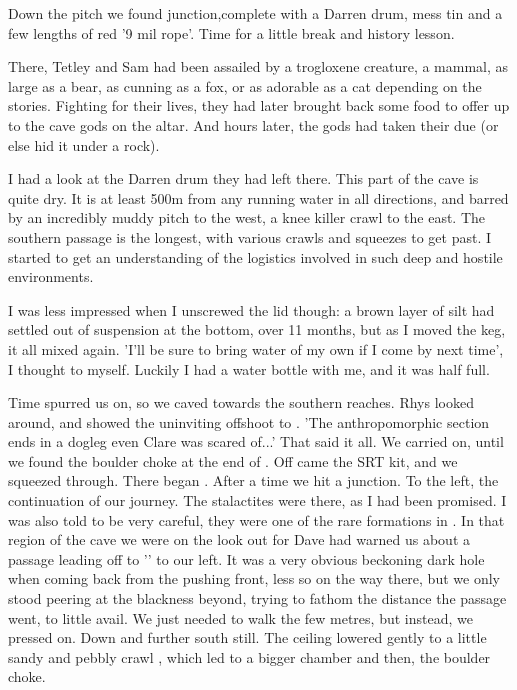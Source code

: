 Down the pitch we found  junction,complete with a Darren drum, mess tin and a few lengths of red '9 mil rope'. Time for a little break and history lesson. 

There, Tetley and Sam had been assailed by a trogloxene creature, a mammal, as large as a bear, as cunning as a fox, or as adorable as a cat depending on the stories. Fighting for their lives, they had later brought back some food to offer up to the cave gods on the  altar. And hours later, the gods had taken their due (or else hid it under a rock). 

I had a look at the Darren drum they had left there. This part of the cave is quite dry. It is at least 500m from any running water in all directions, and barred by an incredibly muddy pitch to the west, a knee killer crawl to the east. The southern passage is the longest, with various crawls and squeezes to get past. I started to get an understanding of the logistics involved in such deep and hostile environments.

I was less impressed when I unscrewed the lid though: a brown layer of silt had settled out of suspension at the bottom, over 11 months, but as I moved the keg, it all mixed again. 'I'll be sure to bring water of my own if I come by next time', I thought to myself. Luckily I had a water bottle with me, and it was half full.

Time spurred us on, so we caved towards the southern reaches. Rhys looked around, and showed the uninviting offshoot to . 'The anthropomorphic section ends in a dogleg even Clare was scared of...' That said it all. We carried on, until we found the boulder choke at the end of . Off came the SRT kit, and we squeezed through. There began . After a time we hit a junction. To the left, the continuation of our journey. The stalactites were there, as I had been promised. I was also told to be very careful, they were one of the rare formations in . In that region of the cave we were on the look out  for Dave had warned us about a passage leading off to '' to our left. It was a very obvious beckoning dark hole when coming back from the pushing front, less so on the way there, but we only stood peering at the blackness beyond, trying to fathom the distance the passage went, to little avail. We just needed to walk the few metres, but instead, we pressed on. Down and further south still. The ceiling lowered gently to a little sandy and pebbly crawl , which led to a bigger chamber and then, the boulder choke.

